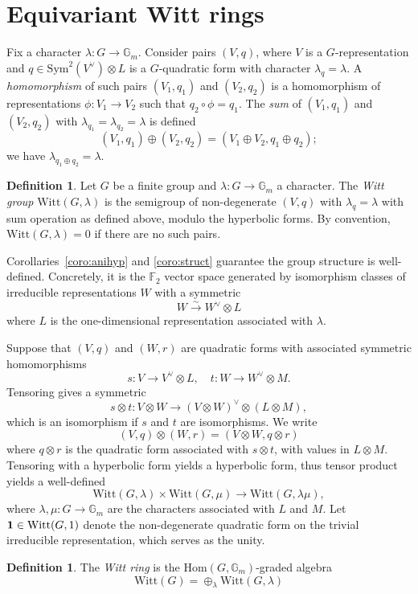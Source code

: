 \documentclass[12pt]{amsart}
\numberwithin{equation}{section}
\newcommand{\lra}{\longrightarrow}
\newcommand{\ra}{\rightarrow}
\newcommand{\bF}{\mathbb{F}}
\newcommand{\bG}{\mathbb{G}}
\newcommand{\Hom}{\mathrm{Hom}}
\newcommand{\Sym}{\mathrm{Sym}}
\newcommand{\Witt}{\mathrm{Witt}}
\theoremstyle{plain}
\theoremstyle{definition}
\newtheorem{defi}[prop]{Definition}
\theoremstyle{remark}
\begin{document}
\section{Equivariant Witt rings}
\label{sect:wring} 

Fix a character $\lambda:G \ra \bG_m$. Consider pairs $(V,q)$, where $V$ is a 
$G$-representation and $q\in \Sym^2(V^{\vee})\otimes L$ is a $G$-quadratic form 
with character $\lambda_q=\lambda$. A {\em homomorphism} of such pairs $(V_1,q_1)$
and $(V_2,q_2)$ is a 
homomorphism of representations $\phi:V_1\rightarrow V_2$ such that
$q_2\circ \phi = q_1$.  
The {\em sum} of $(V_1,q_1)$ and $(V_2,q_2)$ with
$\lambda_{q_1}=\lambda_{q_2}=\lambda$ is defined
$$(V_1,q_1) \oplus (V_2,q_2) = (V_1\oplus V_2, q_1 \oplus q_2);$$
we have $\lambda_{q_1 \oplus q_2}=\lambda$.  

\begin{defi}
Let $G$ be a finite group and $\lambda:G \ra \bG_m$ a character.
The {\em Witt group} $\Witt(G,\lambda)$ is the semigroup of non-degenerate $(V,q)$ with $\lambda_q=\lambda$ with sum operation
as defined above, modulo the hyperbolic forms. 
By convention, $\Witt(G,\lambda)=0$ if there are no such pairs.
\end{defi}
Corollaries~\ref{coro:anihyp} and \ref{coro:struct}
guarantee the group structure is well-defined. 
Concretely, it is the $\bF_2$ vector space generated by isomorphism classes
of irreducible representations $W$ with a symmetric 
$$W \stackrel{\sim}{\lra} W^{\vee} \otimes L$$
where $L$ is the one-dimensional representation associated with $\lambda$. 


Suppose that $(V,q)$ and $(W,r)$ are quadratic forms with associated symmetric
homomorphisms
$$s:V \lra V^{\vee} \otimes L, \quad
t:W \lra W^{\vee} \otimes M.$$
Tensoring gives a symmetric
$$s\otimes t: V\otimes W \lra (V\otimes W)^{\vee} \otimes (L \otimes M),$$
which is an isomorphism if $s$ and $t$ are isomorphisms.  
We write 
$$(V,q) \otimes (W,r) = (V\otimes W, q\otimes r)$$
where $q\otimes r$ is the quadratic form associated with $s\otimes t$, with values in $L\otimes M$. 
Tensoring with a hyperbolic form yields a hyperbolic form, thus tensor product yields 
a well-defined
$$\Witt(G,\lambda) \times \Witt(G,\mu) \lra \Witt(G,\lambda \mu),$$
where $\lambda,\mu:G \rightarrow \bG_m$ are the characters associated with $L$ and $M$.
Let ${\bf 1} \in \Witt(G,1)$ denote the non-degenerate quadratic form on the trivial irreducible representation, 
which serves as the unity. 

 
\begin{defi}
The {\em Witt ring} is the $\Hom(G,\bG_m)$-graded algebra
\begin{equation} \Witt(G)=\oplus_{\lambda} \Witt(G,\lambda) 
\label{eqn:grading}
\end{equation}
\end{defi}
\end{document}
